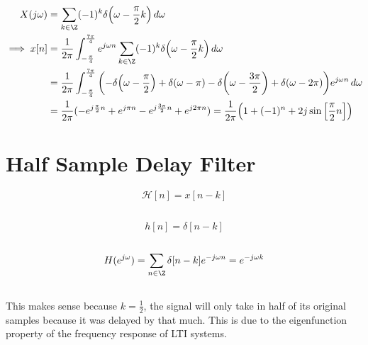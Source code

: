 \documentclass{article}
\begin{document}
\begin{align}
    X(j \omega) &= \sum_{k \in \Z} (-1)^k \delta\qty(\omega - \frac{\pi}{2} k) \, d\omega \\
    \implies x[n] &= \frac{1}{2\pi} \int_{-\frac{\pi}{4}}^{\frac{7\pi}{4}} e^{j \omega n} \sum_{k \in \Z} (-1)^k \delta\qty(\omega - \frac{\pi}{2} k) \, d\omega \\
    &= \frac{1}{2\pi} \int_{-\frac{\pi}{4}}^{\frac{7\pi}{4}} \qty(-\delta\qty(\omega - \frac{\pi}{2}) + \delta(\omega - \pi) - \delta\qty(\omega - \frac{3\pi}{2}) + \delta(\omega - 2\pi)) e^{j \omega n} \, d\omega \\
    &= \frac{1}{2\pi} (-e^{j \frac{\pi}{2} n} + e^{j \pi n} - e^{j \frac{3\pi}{2} n} + e^{j 2\pi n}) = \frac{1}{2\pi} \qty(1 + (-1)^n + 2j \sin\qty[\frac{\pi}{2} n])
\end{align}

\section{Half Sample Delay Filter}

\begin{equation}
    \mathcal{H}[n] = x[n - k]
\end{equation}

\subsection{}

\begin{equation}
    h[n] = \delta[n - k]
\end{equation}

\subsection{}

\begin{align}
    H(e^{j \omega}) = \sum_{n \in \Z} \delta[n - k] e^{-j \omega n} = e^{-j \omega k}
\end{align}

\subsection{}

This makes sense because \(k = \frac{1}{2}\), the signal will only take in half of its original samples because it was delayed by that much.
This is due to the eigenfunction property of the frequency response of LTI systems.
\end{document}
